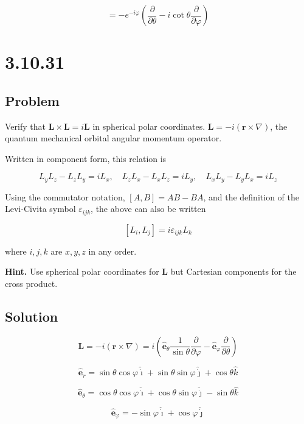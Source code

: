 \documentclass[12pt]{article}
\begin{document}
\[
    = - e^{-i \varphi}
    \left(
    \frac{\partial}{\partial \theta}
    - i \cot{\theta}\frac{\partial}{\partial \varphi}
    \right)
\]

\section{3.10.31}

\subsection{Problem}

Verify that \(\textbf{L} \times \textbf{L} = i \textbf{L}\) in spherical polar coordinates.
\(\textbf{L} = -i \left(\textbf{r} \times \nabla\right)\), the quantum mechanical orbital angular
momentum operator.

Written in component form, this relation is

\[
    L_y L_z - L_z L_y = i L_x , \quad L_z L_x - L_x L_z = i L_y ,\quad L_x L_y - L_y L_x = i L_z
\]

Using the commutator notation, \([A, B] = AB - BA\), and the definition of the Levi-Civita symbol
\(\varepsilon_{ijk}\), the above can also be written

\[
    [L_i, L_j] = i \varepsilon_{ijk} L_k
\]

where \(i , j , k\) are \(x, y, z\) in any order.

\textbf{Hint.} Use spherical polar coordinates for \textbf{L}
but Cartesian components for the cross product.

\subsection{Solution}

\[
    \textbf{L} = -i \left(\textbf{r} \times \nabla\right)
    = i
    \left(
    \hat{\mathbf{e}}_\theta \frac{1}{\sin{\theta}} \frac{\partial}{\partial \varphi}
    - \hat{\mathbf{e}}_\varphi \frac{\partial}{\partial \theta}
    \right)
\]

\[
    \hat{\mathbf{e}}_r
    = \sin{\theta} \cos{\varphi} \hat{\dot{\imath}} + \sin{\theta} \sin{\varphi} \hat{\dot{\jmath}}
    + \cos{\theta} \hat{k}
\]

\[
    \hat{\mathbf{e}}_\theta
    = \cos{\theta} \cos{\varphi} \hat{\dot{\imath}}
    + \cos{\theta} \sin{\varphi} \hat{\dot{\jmath}}
    - \sin{\theta} \hat{k}
\]

\[
    \hat{\mathbf{e}}_\varphi
    = -\sin{\varphi} \hat{\dot{\imath}}
    + \cos{\varphi} \hat{\dot{\jmath}}
\]
\end{document}
